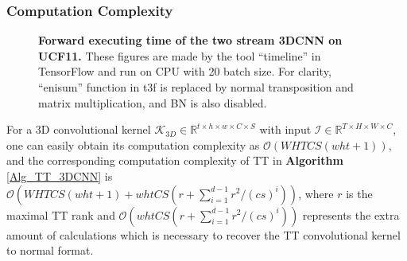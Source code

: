 \documentclass[a4paper,fleqn]{cas-dc}
\begin{document}
\subsubsection{Computation Complexity}\quad

\begin{figure*}
\centering
{}
\caption{\textbf{Forward executing time of the two stream 3DCNN on UCF11.} These figures are made by the tool ``timeline'' in TensorFlow and run on CPU with 20 batch size. For clarity, ``enisum'' function in t3f is replaced by normal transposition and matrix multiplication, and BN is also disabled.}
\label{Fig_timeline}
\end{figure*}

For a 3D convolutional kernel \(\bm{\mathcal{K}}_{3D} \in \mathbb{R} ^{t \times h \times w \times C \times S}\) with input \(\bm{\mathcal{I}} \in \mathbb{R} ^{T \times H \times W \times C}\), one can easily obtain its computation complexity as \(\mathcal{O}(WHTCS(wht+1))\), and the corresponding computation complexity of TT in \textbf{Algorithm} \ref{Alg_TT_3DCNN} is \(\mathcal{O}(WHTCS(wht+1)+whtCS(r+\sum_{i=1}^{d-1} r^{2}/(cs)^{i}))\), where \(r\) is the maximal TT rank and \(\mathcal{O}(whtCS(r+\sum_{i=1}^{d-1} r^{2}/(cs)^{i}))\) represents the extra amount of calculations which is necessary to recover the TT convolutional kernel to normal format.
\end{document}
